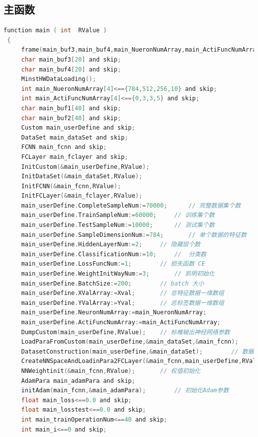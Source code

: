 \documentclass[UTF-8]{progbookcn}
\begin{document}
\subsection{主函数}
\begin{lstlisting}[language=C,caption={主函数代码}]
 function main ( int  RValue )
 {
     frame(main_buf3,main_buf4,main_NueronNumArray,main_ActiFuncNumArray,main_buf1,main_buf2,main_userDefine,main_dataSet,main_fcnn,main_fclayer,main_adamPara,main_loss,main_losstest,main_trainOperationNum,main_i,main_j,main_temp$_1) and (
     char main_buf3[20] and skip;
     char main_buf4[20] and skip;
     MinstHWDataLoading();
     int main_NueronNumArray[4]<=={784,512,256,10} and skip;
     int main_ActiFuncNumArray[4]<=={0,3,3,5} and skip;
     char main_buf1[40] and skip;
     char main_buf2[40] and skip;
     Custom main_userDefine and skip;
     DataSet main_dataSet and skip;
     FCNN main_fcnn and skip;
     FCLayer main_fclayer and skip;
     InitCustom(&main_userDefine,RValue);
     InitDataSet(&main_dataSet,RValue);
     InitFCNN(&main_fcnn,RValue);
     InitFCLayer(&main_fclayer,RValue);
     main_userDefine.CompleteSampleNum:=70000;      // 完整数据集个数
     main_userDefine.TrainSampleNum:=60000;     // 训练集个数
     main_userDefine.TestSampleNum:=10000;      // 测试集个数
     main_userDefine.SampleDimensionNum:=784;       // 单个数据的特征数
     main_userDefine.HiddenLayerNum:=2;     // 隐藏层个数
     main_userDefine.ClassificationNum:=10;     //  分类数
     main_userDefine.LossFuncNum:=1;        // 损失函数 CE
     main_userDefine.WeightInitWayNum:=3;       // 凯明初始化
     main_userDefine.BatchSize:=200;        // batch 大小
     main_userDefine.XValArray:=Xval;       // 总特征数据一维数组
     main_userDefine.YValArray:=Yval;       // 总标签数据一维数组
     main_userDefine.NeuronNumArray:=main_NueronNumArray;
     main_userDefine.ActiFuncNumArray:=main_ActiFuncNumArray;
     DumpCustom(main_userDefine,RValue);    // 标椎输出神经网络参数
     LoadParaFromCustom(main_userDefine,&main_dataSet,&main_fcnn);      // 参数录入到相关结构体
     DatasetConstruction(main_userDefine,&main_dataSet);        // 数据集构建
     CreateNNSpaceAndLoadinPara2FCLayer(&main_fcnn,main_userDefine,RValue);     // 神经网络空间创建及神经网络层参数传入
     NNWeightinit(&main_fcnn,RValue);       // 权值初始化
     AdamPara main_adamPara and skip;
     initAdam(main_fcnn,&main_adamPara);        // 初始化Adam参数
     float main_loss<==0.0 and skip;
     float main_losstest<==0.0 and skip;
     int main_trainOperationNum<==40 and skip;
     int main_i<==0 and skip;


\end{lstlisting}
\end{document}
